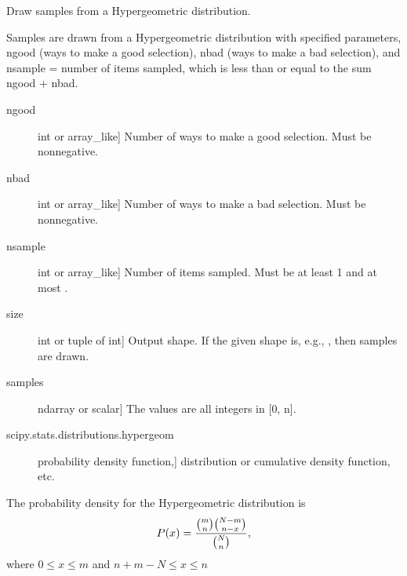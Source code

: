 \documentclass[letterpaper,10pt,english]{sphinxmanual}
\begin{document}
\begin{fulllineitems}
\label{pygeomod:pygeomod.geomodeller_xml_obj.hypergeometric}
Draw samples from a Hypergeometric distribution.

Samples are drawn from a Hypergeometric distribution with specified
parameters, ngood (ways to make a good selection), nbad (ways to make
a bad selection), and nsample = number of items sampled, which is less
than or equal to the sum ngood + nbad.
\begin{description}
\item[{ngood}] \leavevmode{[}int or array\_like{]}
Number of ways to make a good selection.  Must be nonnegative.

\item[{nbad}] \leavevmode{[}int or array\_like{]}
Number of ways to make a bad selection.  Must be nonnegative.

\item[{nsample}] \leavevmode{[}int or array\_like{]}
Number of items sampled.  Must be at least 1 and at most
.

\item[{size}] \leavevmode{[}int or tuple of int{]}
Output shape.  If the given shape is, e.g., , then
 samples are drawn.

\end{description}
\begin{description}
\item[{samples}] \leavevmode{[}ndarray or scalar{]}
The values are all integers in  {[}0, n{]}.

\end{description}
\begin{description}
\item[{scipy.stats.distributions.hypergeom}] \leavevmode{[}probability density function,{]}
distribution or cumulative density function, etc.

\end{description}

The probability density for the Hypergeometric distribution is
\begin{gather}
\begin{split}P(x) = \frac{\binom{m}{n}\binom{N-m}{n-x}}{\binom{N}{n}},\end{split}\notag
\end{gather}
where \(0 \le x \le m\) and \(n+m-N \le x \le n\)


\end{fulllineitems}
\end{document}
